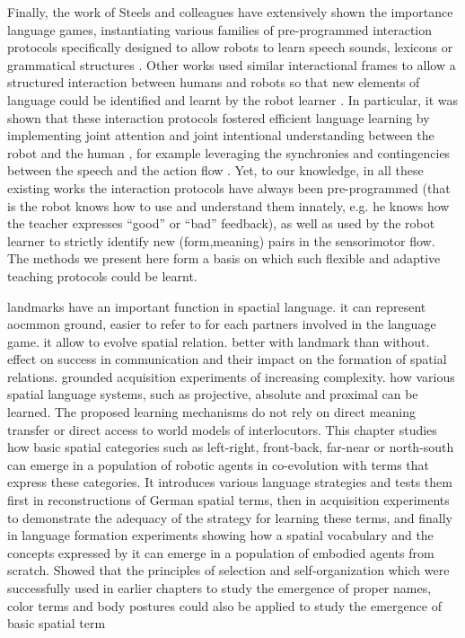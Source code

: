 Finally, the work of Steels and colleagues \cite{steels2012grounding,steels2002aibos} have extensively shown the importance language games, instantiating various families of pre-programmed interaction protocols specifically designed to allow robots to learn speech sounds\cite{de2000self,oudeyer2006self}, lexicons \cite{steels2002aibos} or grammatical structures \cite{steels06spatialLanguage, steels2008can}. Other works used similar interactional frames to allow a structured interaction between humans and robots so that new elements of language could be identified and learnt by the robot learner \cite{roy02a,lyon2012interactive,cangelosi06b,yu2004multimodal,cangelosi2010integration,sugita05a,dominey2005learning,cederborg2011imitating}. In particular, it was shown that these interaction protocols fostered efficient language learning by implementing joint attention and joint intentional understanding between the robot and the human \cite{kaplan2006challenges,yu2005role,yu2007unified}, for example leveraging the synchronies and contingencies between the speech and the action flow \cite{rohlfing2006can,schillingmann2011acoustic}. Yet, to our knowledge, in all these existing works the interaction protocols have always been pre-programmed (that is the robot knows how to use and understand them innately, e.g. he knows how the teacher expresses ``good'' or ``bad'' feedback), as well as used by the robot learner to strictly identify new (form,meaning) pairs in the sensorimotor flow. The methods we present here form a basis on which such flexible and adaptive teaching protocols could be learnt.

\cite{spranger2013evolutionary} landmarks have an important function in spactial language. it can represent aocmmon ground, easier to refer to for each partners involved in the language game. it allow to evolve spatial relation. better with landmark than without. effect on success in communication and their impact on the
formation of spatial relations.
\cite{spranger2012emergent} \cite{spranger2013grounded} grounded acquisition experiments of increasing complexity. how various spatial language systems, such as projective, absolute and proximal can be learned. The proposed learning mechanisms do not rely on direct meaning transfer or direct access to world models of interlocutors.
\cite{spranger2012co} This chapter studies how basic spatial categories such as left-right, front-back, far-near or north-south can emerge in a population of robotic agents in co-evolution with terms that express these categories. It introduces various language strategies and tests them first in reconstructions of German spatial terms, then in acquisition experiments to demonstrate the adequacy of the strategy for learning these terms, and finally in language formation experiments showing how a spatial vocabulary and the concepts expressed by it can emerge in a population of embodied agents from scratch. Showed that the principles of selection and self-organization which were successfully used in earlier chapters to study the emergence of proper names, color terms and body postures could also be applied to study the emergence of basic spatial term

